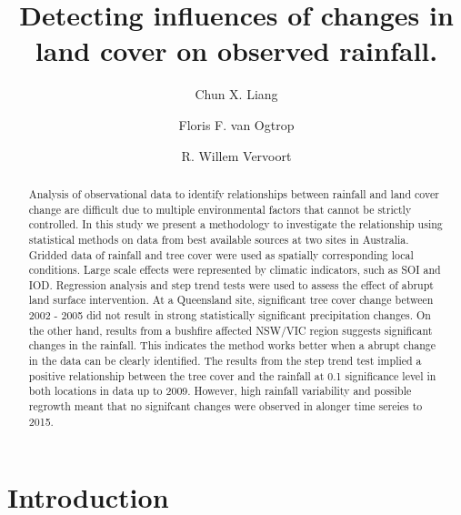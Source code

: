 \documentclass[]{elsarticle} %
\theoremstyle{definition}
\theoremstyle{definition}
\theoremstyle{definition}
\theoremstyle{remark}
\begin{document}
\begin{frontmatter}

  \title{Detecting influences of changes in land cover on observed rainfall.}
    \author[a]{Chun X. Liang}
  
    \author[a]{Floris F. van Ogtrop}
  
    \author[a]{R. Willem Vervoort}
      \address[a]{Sydney Institute of Agriculture, The University of Sydney, NSW 2006}
  
  \begin{abstract}
  Analysis of observational data to identify relationships between
  rainfall and land cover change are difficult due to multiple
  environmental factors that cannot be strictly controlled. In this study
  we present a methodology to investigate the relationship using
  statistical methods on data from best available sources at two sites in
  Australia. Gridded data of rainfall and tree cover were used as
  spatially corresponding local conditions. Large scale effects were
  represented by climatic indicators, such as SOI and IOD. Regression
  analysis and step trend tests were used to assess the effect of abrupt
  land surface intervention. At a Queensland site, significant tree cover
  change between 2002 - 2005 did not result in strong statistically
  significant precipitation changes. On the other hand, results from a
  bushfire affected NSW/VIC region suggests significant changes in the
  rainfall. This indicates the method works better when a abrupt change in
  the data can be clearly identified. The results from the step trend test
  implied a positive relationship between the tree cover and the rainfall
  at 0.1 significance level in both locations in data up to 2009. However,
  high rainfall variability and possible regrowth meant that no signifcant
  changes were observed in alonger time sereies to 2015.
  \end{abstract}
  
 \end{frontmatter}

\section{Introduction}\label{introduction}
\end{document}

